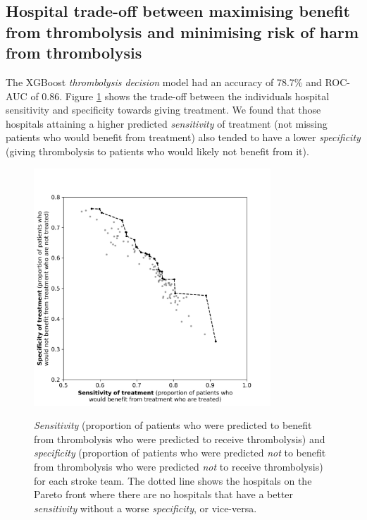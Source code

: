 
\subsection{Hospital trade-off between maximising benefit from thrombolysis and minimising risk of harm from thrombolysis}

The XGBoost \textit{thrombolysis decision} model had an accuracy of 78.7\% and ROC-AUC of 0.86. Figure \ref{fig:hosp_shap_scatter} shows the trade-off between the individuals hospital sensitivity and specificity towards giving treatment. We found that those hospitals attaining a higher predicted \textit{sensitivity} of treatment (not missing patients who would benefit from treatment) also tended to have a lower \textit{specificity} (giving thrombolysis to patients who would likely not benefit from it).


\begin{figure}
    \centering
    {\includegraphics[width=3.5in]{./images/210_xgb_all_data_multiclass_outcome_spec_sens.jpg}}\\ 
    \caption{\textit{Sensitivity} (proportion of patients who were predicted to benefit from thrombolysis who were predicted to receive thrombolysis) and \textit{specificity} (proportion of patients who were predicted \textit{not} to benefit from thrombolysis who were predicted \textit{not} to receive thrombolysis) for each stroke team. The dotted line shows the hospitals on the Pareto front where there are no hospitals that have a better \textit{sensitivity} without a worse \textit{specificity}, or vice-versa.}
    \label{fig:hosp_shap_scatter}
\end{figure}